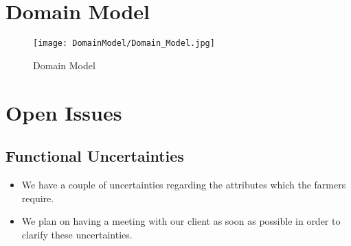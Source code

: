 \documentclass[11pt,fleqn]{book} %
\begin{document}

\chapter{Domain Model}
\begin{figure}
	\texttt{[image: DomainModel/Domain\_Model.jpg]}
	\caption{Domain Model}
\end{figure}	
	


\chapter{Open Issues}

\section{Functional Uncertainties}
\begin{itemize}
	\item We have a couple of uncertainties regarding the attributes which the farmers require.
	\item We plan on having a meeting with our client as soon as possible in order to clarify these uncertainties.
\end{itemize}
\end{document}
